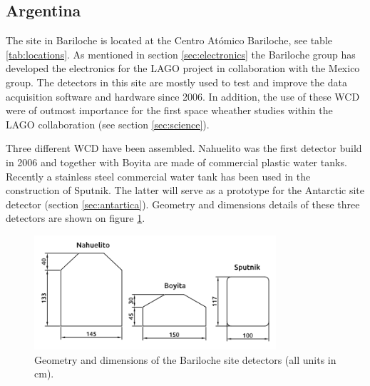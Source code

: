 \subsection{Argentina}\label{subsec:arg}

The site in Bariloche is located at the Centro Atómico Bariloche, see table
\ref{tab:locations}. As mentioned in section \ref{sec:electronics} the
Bariloche group has developed the electronics for the LAGO project in
collaboration with the Mexico group. The detectors in this site are mostly used
to test and improve the data acquisition software and hardware since 2006. 
In addition, the use of these WCD were of outmost importance for the first
space wheather studies within the LAGO collaboration (see section
\ref{sec:science}).

Three different WCD have been assembled. Nahuelito was the first detector build in 2006
and together with Boyita are made of commercial plastic water tanks. Recently a
stainless steel commercial water tank has been used in the construction of
Sputnik. The latter will serve as a prototype for the Antarctic site detector
(section \ref{sec:antartica}). Geometry and dimensions details of these three
detectors are shown on figure \ref{fig:bar-tanques}.

\begin{figure}[h!]
\begin{center}
\includegraphics[width=0.8\textwidth]{images/argentina/tanques-bariloche.png}
\caption{Geometry and dimensions of the Bariloche site detectors (all units in cm).} 
\label{fig:bar-tanques}
\end{center}
\end{figure}

